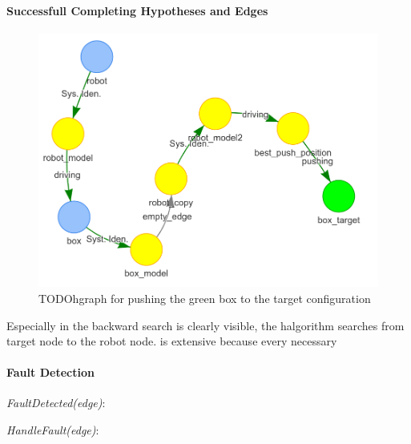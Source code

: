 \paragraph{Successfull Completing Hypotheses and Edges}


\begin{figure}[H]
    \centering
    \includegraphics[width=\textwidth]{figures/proposed_method/connecting_nodes/robot_push/robot_push_9}
    \caption{TODO\ac{hgraph} for pushing the green box to the target configuration}%
    \label{fig:robot_push_4}
\end{figure}
Especially in  the backward search is clearly visible, the \ac{halgorithm} searches from target node to the robot node.  is extensive because every necessary 




\paragraph{Fault Detection}

\textit{FaultDetected(\gls{edge})}:

\textit{HandleFault(\gls{edge})}:





